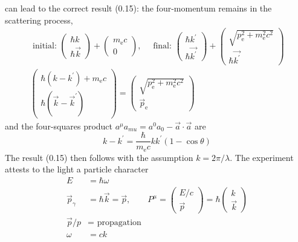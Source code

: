 can lead to the correct result (0.15): the four-momentum remains in the scattering process,
\\
\begin{equation}
\begin{array}{l}{\text { initial: }\left(\begin{array}{c}{\hbar k} \\ {\hbar \vec{k}}\end{array}\right)+\left(\begin{array}{c}{m_{\mathrm{e}} c} \\ {0}\end{array}\right), 
\quad \text { final: }\left(\begin{array}{c}{\hbar k^{\prime}} \\ {\hbar \overrightarrow{k^{\prime}}}\end{array}\right)+\left(\begin{array}{c}{\sqrt{p_{\mathrm{e}}^{2}+m_{\mathrm{e}}^{2} c^{2}}} \\ {\hbar \overrightarrow{k^{\prime}}}\end{array}\right)%
} 
\\ {\left(\begin{array}{c}{\hbar\left(k-k^{\prime}\right)+m_{\mathrm{e}} c} \\ {\hbar\left(\vec{k}-\vec{k}^{\prime}\right)}\end{array}\right)=\left(\begin{array}{c}{\sqrt{p_{\mathrm{e}}^{2}+m_{\mathrm{e}}^{2} c^{2}}} \\ {\vec{p}_{\mathrm{e}}}\end{array}\right)}\end{array}
\end{equation}
and the four-squares product $a^{\mu}a_{mu}=a^0a_0-\vec{a}\cdot\vec{a}$ are
\begin{equation}
k-k^{\prime}=\frac{\hbar}{m_{\mathrm{e}} c} k k^{\prime}(1-\cos \theta)
\end{equation}
The result (0.15) then follows with the assumption $k = 2\pi/\lambda$. The experiment attests to the light a particle character
\\
\begin{equation}
\begin{aligned} E &=\hbar \omega \\ \vec{p}_{\gamma} &=\hbar \vec{k}=\vec{p}, \quad \quad P^{\mu}=\left(\begin{array}{c}{E / c} \\ {\vec{p}}\end{array}\right)=\hbar\left(\begin{array}{c}{k} \\ {\vec{k}}\end{array}\right) \\ \vec{p} / p &=\text { propagation } \\ \omega &=c k \end{aligned}
\end{equation}

